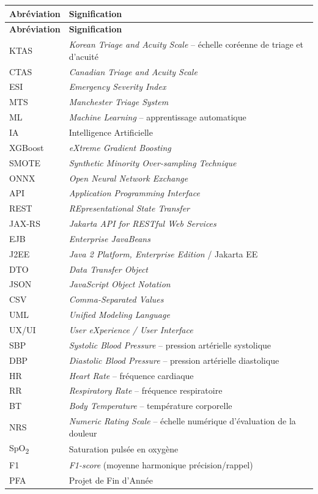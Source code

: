 \documentclass{rapportENSIAS}
\begin{document}
\renewcommand{\arraystretch}{1.3}
\begin{longtable}{p{3.2cm} p{11cm}}
\toprule
\textbf{Abréviation} & \textbf{Signification} \\
\midrule
\endfirsthead
\toprule
\textbf{Abréviation} & \textbf{Signification} \\
\midrule
\endhead
KTAS      & \textit{Korean Triage and Acuity Scale} -- échelle coréenne de triage et d'acuité \\
CTAS      & \textit{Canadian Triage and Acuity Scale} \\
ESI       & \textit{Emergency Severity Index} \\
MTS       & \textit{Manchester Triage System} \\
ML        & \textit{Machine Learning} -- apprentissage automatique \\
IA        & Intelligence Artificielle \\
XGBoost   & \textit{eXtreme Gradient Boosting} \\
SMOTE     & \textit{Synthetic Minority Over-sampling Technique} \\
ONNX      & \textit{Open Neural Network Exchange} \\
API       & \textit{Application Programming Interface} \\
REST      & \textit{REpresentational State Transfer} \\
JAX-RS    & \textit{Jakarta API for RESTful Web Services} \\
EJB       & \textit{Enterprise JavaBeans} \\
J2EE      & \textit{Java 2 Platform, Enterprise Edition} / Jakarta EE \\
DTO       & \textit{Data Transfer Object} \\
JSON      & \textit{JavaScript Object Notation} \\
CSV       & \textit{Comma-Separated Values} \\
UML       & \textit{Unified Modeling Language} \\
UX/UI     & \textit{User eXperience / User Interface} \\
SBP       & \textit{Systolic Blood Pressure} -- pression artérielle systolique \\
DBP       & \textit{Diastolic Blood Pressure} -- pression artérielle diastolique \\
HR        & \textit{Heart Rate} -- fréquence cardiaque \\
RR        & \textit{Respiratory Rate} -- fréquence respiratoire \\
BT        & \textit{Body Temperature} -- température corporelle \\
NRS       & \textit{Numeric Rating Scale} -- échelle numérique d'évaluation de la douleur \\
SpO\textsubscript{2} & Saturation pulsée en oxygène \\
F1        & \textit{F1-score} (moyenne harmonique précision/rappel) \\
PFA       & Projet de Fin d'Année \\
\bottomrule
\end{longtable}
\end{document}
